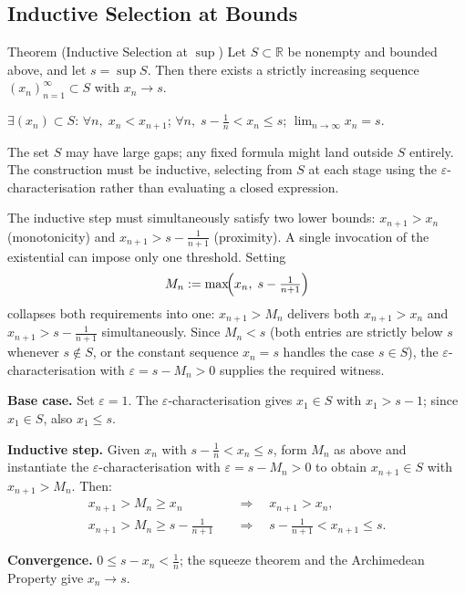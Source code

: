 \subsection*{Inductive Selection at Bounds}
\label{subsec:inductive-selection}

\begin{theorembox}{Theorem (Inductive Selection at $\sup$)}
\label{thm:inductive-selection}
Let $S\subset\mathbb{R}$ be nonempty and bounded above, and let
$s=\sup S$. Then there exists a strictly increasing sequence
$(x_n)_{n=1}^{\infty}\subset S$ with $x_n\to s$.
\end{theorembox}

\begin{remark}
$\exists(x_n)\subset S$: $\forall n,\;x_n<x_{n+1}$;\;
$\forall n,\;s-\tfrac{1}{n}<x_n\leq s$;\;
$\lim_{n\to\infty}x_n=s$.
\end{remark}

\begin{remark}
The set $S$ may have large gaps; any fixed formula might land outside $S$
entirely. The construction must be inductive, selecting from $S$ at each
stage using the $\varepsilon$-characterisation rather than evaluating a
closed expression.
\end{remark}

\begin{remark}
The inductive step must simultaneously satisfy two lower bounds:
$x_{n+1}>x_n$ (monotonicity) and $x_{n+1}>s-\tfrac{1}{n+1}$ (proximity).
A single invocation of the existential can impose only one threshold. Setting
\[
  M_n:=\max\!\Bigl(x_n,\;s-\tfrac{1}{n+1}\Bigr)
\]
collapses both requirements into one: $x_{n+1}>M_n$ delivers both
$x_{n+1}>x_n$ and $x_{n+1}>s-\tfrac{1}{n+1}$ simultaneously. Since
$M_n<s$ (both entries are strictly below $s$ whenever $s\notin S$, or
the constant sequence $x_n=s$ handles the case $s\in S$), the
$\varepsilon$-characterisation with $\varepsilon=s-M_n>0$ supplies the
required witness.

\medskip
\noindent\textbf{Base case.} Set $\varepsilon=1$. The
$\varepsilon$-characterisation gives $x_1\in S$ with $x_1>s-1$; since
$x_1\in S$, also $x_1\leq s$.

\noindent\textbf{Inductive step.} Given $x_n$ with
$s-\tfrac{1}{n}<x_n\leq s$, form $M_n$ as above and instantiate the
$\varepsilon$-characterisation with $\varepsilon=s-M_n>0$ to obtain
$x_{n+1}\in S$ with $x_{n+1}>M_n$. Then:
\begin{align*}
  x_{n+1}>M_n\geq x_n
    &\quad\Rightarrow\quad x_{n+1}>x_n, \\
  x_{n+1}>M_n\geq s-\tfrac{1}{n+1}
    &\quad\Rightarrow\quad s-\tfrac{1}{n+1}<x_{n+1}\leq s.
\end{align*}

\noindent\textbf{Convergence.} $0\leq s-x_n<\tfrac{1}{n}$; the squeeze
theorem and the Archimedean Property give $x_n\to s$.
\end{remark}

